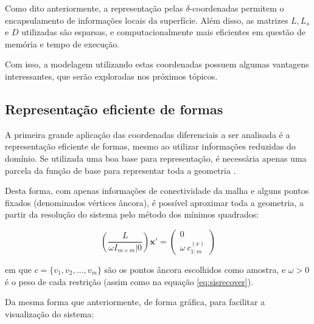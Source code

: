 Como dito anteriormente, a representação pelas $\delta$-coordenadas permitem o encapsulamento de informações locais da superfície. Além disso, as matrizes $L, L_s$ e $D$ utilizadas são esparsas, e computacionalmente mais eficientes em questão de memória e tempo de execução.

Com isso, a modelagem utilizando estas coordenadas possuem algumas vantagens interessantes, que serão exploradas nos próximos tópicos.

\subsection{Representação eficiente de formas}

A primeira grande aplicação das coordenadas diferenciais a ser analisada é a representação eficiente de formas, mesmo ao utilizar informações reduzidas do domínio. Se utilizada uma boa base para representação, é necessária apenas uma parcela da função de base para representar toda a geometria \cite{sorkine2004}.

Desta forma, com apenas informações de conectividade da malha e alguns pontos fixados (denominados vértices âncora), é possível aproximar toda a geometria, a partir da resolução do sistema pelo método dos mínimos quadrados:

\begin{equation}\label{eq:sisrecover2}
\left( \frac{L}{\omega I_{m \times m} | 0} \right) \mathbf{x'} = \begin{pmatrix}
0\\
\omega\ c_{1:m}^{(x)}
\end{pmatrix}
\end{equation}

\noindent em que $c = \{v_1, v_2, \dots, v_m\}$ são os pontos âncora escolhidos como amostra, e $\omega > 0$ é o peso de cada restrição (assim como na equação \ref{eq:sisrecover}).

Da mesma forma que anteriormente, de forma gráfica, para facilitar a visualização do sistema:

\begin{center}
\end{center}

